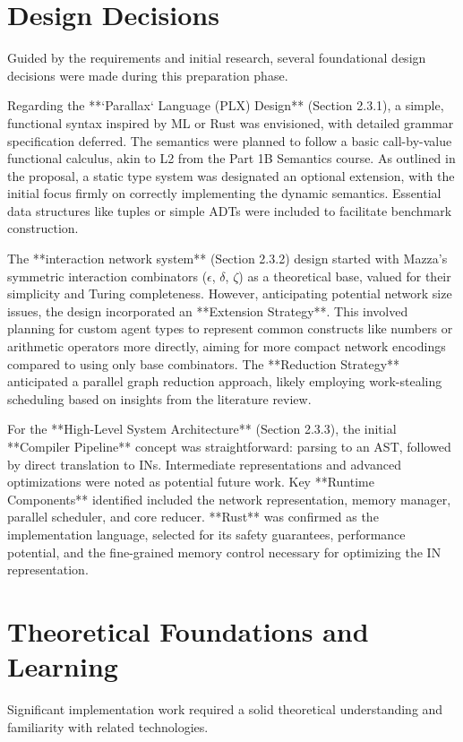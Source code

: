 \section{Design Decisions} %
Guided by the requirements and initial research, several foundational design decisions were made during this preparation phase.

Regarding the **`Parallax` Language (PLX) Design** (Section 2.3.1), a simple, functional syntax inspired by ML or Rust was envisioned, with detailed grammar specification deferred. The semantics were planned to follow a basic call-by-value functional calculus, akin to L2 from the Part 1B Semantics course. As outlined in the proposal, a static type system was designated an optional extension, with the initial focus firmly on correctly implementing the dynamic semantics. Essential data structures like tuples or simple ADTs were included to facilitate benchmark construction.

The **interaction network system** (Section 2.3.2) design started with Mazza's symmetric interaction combinators ($\epsilon$, $\delta$, $\zeta$) \cite{mazza} as a theoretical base, valued for their simplicity and Turing completeness. However, anticipating potential network size issues, the design incorporated an **Extension Strategy**. This involved planning for custom agent types to represent common constructs like numbers or arithmetic operators more directly, aiming for more compact network encodings compared to using only base combinators. The **Reduction Strategy** anticipated a parallel graph reduction approach, likely employing work-stealing scheduling based on insights from the literature review.

For the **High-Level System Architecture** (Section 2.3.3), the initial **Compiler Pipeline** concept was straightforward: parsing to an AST, followed by direct translation to INs. Intermediate representations and advanced optimizations were noted as potential future work. Key **Runtime Components** identified included the network representation, memory manager, parallel scheduler, and core reducer. **Rust** was confirmed as the implementation language, selected for its safety guarantees, performance potential, and the fine-grained memory control necessary for optimizing the IN representation.

\section{Theoretical Foundations and Learning} %
Significant implementation work required a solid theoretical understanding and familiarity with related technologies.


